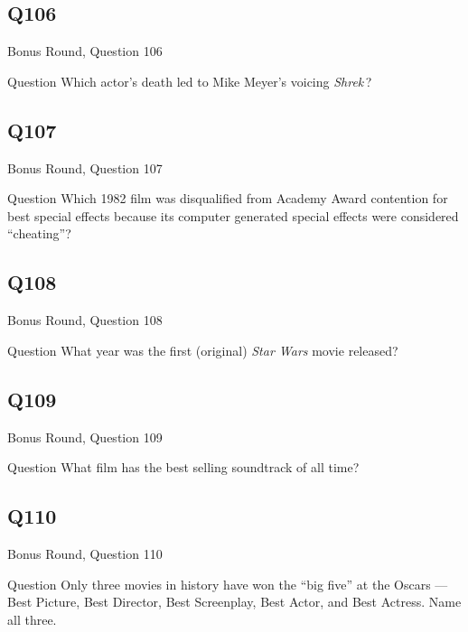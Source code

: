 \documentclass[11pt]{beamer}
\begin{document}
\subsection*{Q106}
\begin{frame}[t]{Bonus Round, Question 106}
  \vspace{2em}
  \begin{block}{Question}
    Which actor's death led to Mike Meyer's voicing \emph{Shrek}\,?
  \end{block}
\end{frame}


\subsection*{Q107}
\begin{frame}[t]{Bonus Round, Question 107}
  \vspace{2em}
  \begin{block}{Question}
    Which 1982 film was disqualified from Academy Award contention for best special effects because its computer generated special effects were considered ``cheating''?
  \end{block}
\end{frame}


\subsection*{Q108}
\begin{frame}[t]{Bonus Round, Question 108}
  \vspace{2em}
  \begin{block}{Question}
    What year was the first (original) \emph{Star Wars} movie released?
  \end{block}
\end{frame}


\subsection*{Q109}
\begin{frame}[t]{Bonus Round, Question 109}
  \vspace{2em}
  \begin{block}{Question}
    What film has the best selling soundtrack of all time?
  \end{block}
\end{frame}


\subsection*{Q110}
\begin{frame}[t]{Bonus Round, Question 110}
  \vspace{2em}
  \begin{block}{Question}
    Only three movies in history have won the ``big five'' at the Oscars — Best Picture, Best Director, Best Screenplay, Best Actor, and Best Actress. Name all three.
  \end{block}
\end{frame}
\end{document}

